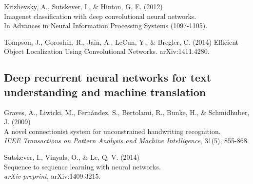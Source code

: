\documentclass[]{article}
\begin{document}

Krizhevsky, A., Sutskever, I., \& Hinton, G. E. (2012)\\ Imagenet classification
with deep convolutional neural networks.\\ In Advances in Neural Information
Processing Systems (1097-1105).



Tompson, J., Goroshin, R., Jain, A., LeCun, Y., \& Bregler, C. (2014)
Efficient Object Localization Using Convolutional Networks. arXiv:1411.4280.


\subsection{Deep recurrent neural networks for text understanding and machine translation}

Graves, A., Liwicki, M., Fernández, S., Bertolami, R., Bunke, H., \&
Schmidhuber, J. (2009)\\ A novel connectionist system for unconstrained
handwriting recognition.\\ {\it IEEE Transactions on Pattern Analysis and
  Machine Intelligence}, 31(5), 855-868.


Sutskever, I., Vinyals, O., \& Le, Q. V. (2014)\\ Sequence to sequence learning
with neural networks.\\ {\it arXiv preprint}, arXiv:1409.3215.
\end{document}
